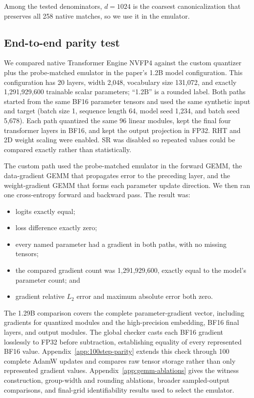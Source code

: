 \documentclass[11pt]{article}
\newcommand{\nv}{NVFP4}
\begin{document}
Among the tested denominators, $d=1024$ is the coarsest canonicalization that
preserves all 258 native matches, so we use it in the emulator.

\subsection{End-to-end parity test}

We compared native Transformer Engine \nv{} against the custom quantizer plus
the probe-matched emulator in the paper's 1.2B model configuration.  This
configuration has 20 layers, width 2,048, vocabulary size 131,072, and exactly
1,291,929,600 trainable scalar parameters; ``1.2B'' is a rounded label.
Both paths started from the same BF16 parameter tensors and used the same
synthetic input and target (batch size 1, sequence length 64, model seed 1,234,
and batch seed 5,678).  Each path quantized the same 96 linear modules, kept the
final four transformer layers in BF16, and kept the output projection in FP32.
RHT and 2D weight scaling were enabled.  SR was disabled so repeated values
could be compared exactly rather than statistically.

The custom path used the probe-matched emulator in the forward GEMM, the
data-gradient GEMM that propagates error to the preceding layer, and the
weight-gradient GEMM that forms each parameter update direction.  We then ran
one cross-entropy forward and backward pass.  The result was:

\begin{itemize}
  \item logits exactly equal;
  \item loss difference exactly zero;
  \item every named parameter had a gradient in both paths, with no missing
        tensors;
  \item the compared gradient count was 1,291,929,600, exactly equal to the
        model's parameter count; and
  \item gradient relative $L_2$ error and maximum absolute error both zero.
\end{itemize}

The 1.29B comparison covers the complete parameter-gradient vector, including
gradients for quantized modules and the high-precision embedding, BF16 final layers,
and output modules.  The global checker casts each BF16 gradient losslessly to
FP32 before subtraction, establishing equality of every represented BF16
value.
Appendix~\ref{app:100step-parity} extends this check through 100 complete
AdamW updates and compares raw tensor storage rather than only represented
gradient values.  Appendix~\ref{app:gemm-ablations} gives the witness
construction, group-width and rounding ablations, broader sampled-output
comparisons, and final-grid identifiability results used to select the
emulator.
\end{document}
